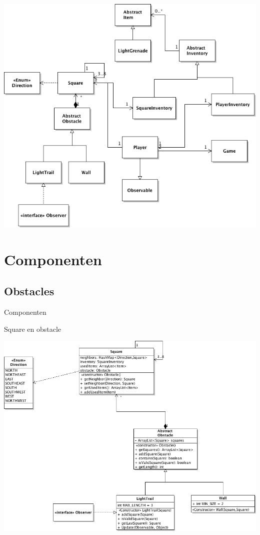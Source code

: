 \documentclass[t]{beamer}
\begin{document}
\begin{frame}[plain]
\begin{center}
\includegraphics[width= 0.9\linewidth]{../uml/SimpleOverview.png}
\end{center}
\end{frame}

\section{Componenten}
\subsection{Obstacles}
\begin{frame}{Componenten}
\begin{multicols}{2}
\tableofcontents[currentsection]
\end{multicols}
\end{frame}

\begin{frame}[plain]{Square en obstacle}
\begin{center}
\includegraphics[width= 0.9\linewidth]{../uml/classdiagramObstaclesSquare.png}
\end{center}
\end{frame}
\end{document}
